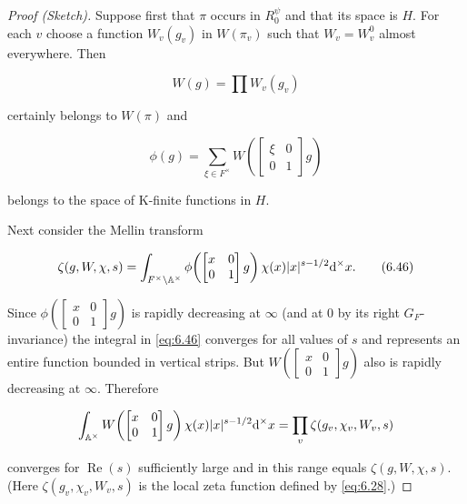 \begin{proof}[Proof (Sketch)]

Suppose first that $\pi$ occurs in $R_0^{\psi}$ and that its space is $H$. For each $v$ choose a function $W_v(g_v)$ in $W(\pi_v)$ such that $W_v = W_v^0$ almost everywhere. Then

\[
W(g) = \prod W_v(g_v)
\]

certainly belongs to $W(\pi)$ and

\begin{equation}\label{eq:6.45}
\phi(g) = \sum_{\xi \in F^{\times}} W\!\left(\begin{bmatrix} \xi & 0 \\ 0 & 1 \end{bmatrix} g\right)\tag{6.45}
\end{equation}

belongs to the space of K-finite functions in $H$.

Next consider the Mellin transform

\begin{equation}\label{eq:6.46}
\zeta(g, W, \chi, s) = \int_{F^{\times} \backslash \mathbb{A}^{\times}} \phi\!\left(\begin{bmatrix} x & 0 \\ 0 & 1 \end{bmatrix} g\right) \chi(x) |x|^{s - 1/2} \mathrm{d}^{\times} x.\tag{6.46}
\end{equation}

Since $\phi\!\left(\begin{bmatrix} x & 0 \\ 0 & 1 \end{bmatrix} g\right)$ is rapidly decreasing at $\infty$ (and at $0$ by its right $G_F$-invariance) the integral in \eqref{eq:6.46} converges for all values of $s$ and represents an entire function bounded in vertical strips. But $W\!\left(\begin{bmatrix} x & 0 \\ 0 & 1 \end{bmatrix} g\right)$ also is rapidly decreasing at $\infty$. Therefore

\[
\int_{\mathbb{A}^{\times}} W\!\left(\begin{bmatrix} x & 0 \\ 0 & 1 \end{bmatrix} g\right) \chi(x) |x|^{s - 1/2} \mathrm{d}^{\times} x = \prod_v \zeta(g_v, \chi_v, W_v, s)
\]

converges for $\operatorname{Re}(s)$ sufficiently large and in this range equals $\zeta(g, W, \chi, s)$. (Here $\zeta(g_v, \chi_v, W_v, s)$ is the local zeta function defined by \eqref{eq:6.28}.)


\end{proof}
